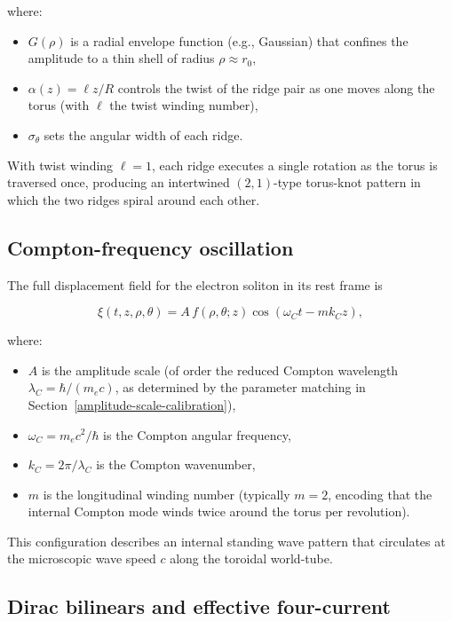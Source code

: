 where:
\begin{itemize}
\item $G(\rho)$ is a radial envelope function (e.g., Gaussian) that confines the
  amplitude to a thin shell of radius $\rho \approx r_0$,
\item $\alpha(z) = \ell z / R$ controls the twist of the ridge pair as one moves
  along the torus (with $\ell$ the twist winding number),
\item $\sigma_\theta$ sets the angular width of each ridge.
\end{itemize}

With twist winding $\ell=1$, each ridge executes a single rotation as the torus
is traversed once, producing an intertwined $(2,1)$-type torus-knot pattern in
which the two ridges spiral around each other.

\subsection{Compton-frequency oscillation}

The full displacement field for the electron soliton in its rest frame is

\begin{equation}
\xi(t,z,\rho,\theta) = A \, f(\rho,\theta;z) \cos(\omega_C t - m k_C z),
\label{eq:xi-electron-init}
\end{equation}

where:
\begin{itemize}
\item $A$ is the amplitude scale (of order the reduced Compton wavelength
  $\lambda_C = \hbar/(m_e c)$, as determined by the parameter matching in
  Section~\ref{amplitude-scale-calibration}),
\item $\omega_C = m_e c^2 / \hbar$ is the Compton angular frequency,
\item $k_C = 2\pi / \lambda_C$ is the Compton wavenumber,
\item $m$ is the longitudinal winding number (typically $m=2$, encoding that the
  internal Compton mode winds twice around the torus per revolution).
\end{itemize}

This configuration describes an internal standing wave pattern that circulates
at the microscopic wave speed $c$ along the toroidal world-tube.

\subsection{Dirac bilinears and effective four-current}

